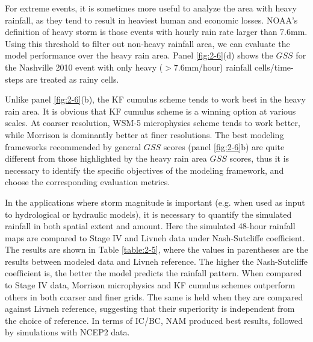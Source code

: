 For extreme events, it is sometimes more useful to analyze the area with heavy rainfall, as they tend to result in heaviest human and economic losses. NOAA’s definition of heavy storm is those events with hourly rain rate larger than 7.6mm. Using this threshold to filter out non-heavy rainfall area, we can evaluate the model performance over the heavy rain area. Panel \ref{fig:2-6}(d) shows the $GSS$ for the Nashville 2010 event with only heavy ($>$7.6mm/hour) rainfall cells/time-steps are treated as rainy cells.

Unlike panel \ref{fig:2-6}(b), the KF cumulus scheme tends to work best in the heavy rain area. It is obvious that KF cumulus scheme is a winning option at various scales. At coarser resolution, WSM-5 microphysics scheme tends to work better, while Morrison is dominantly better at finer resolutions. The best modeling frameworks recommended by general $GSS$ scores (panel \ref{fig:2-6}b) are quite different from those highlighted by the heavy rain area $GSS$ scores, thus it is necessary to identify the specific objectives of the modeling framework, and choose the corresponding evaluation metrics.

In the applications where storm magnitude is important (e.g. when used as input to hydrological or hydraulic models), it is necessary to quantify the simulated rainfall in both spatial extent and amount. Here the simulated 48-hour rainfall maps are compared to Stage IV and Livneh data under Nash-Sutcliffe coefficient. The results are shown in Table \ref{table:2-5}, where the values in parentheses are the results between modeled data and Livneh reference. The higher the Nash-Sutcliffe coefficient is, the better the model predicts the rainfall pattern. When compared to Stage IV data, Morrison microphysics and KF cumulus schemes outperform others in both coarser and finer grids. The same is held when they are compared against Livneh reference, suggesting that their superiority is independent from the choice of reference. In terms of IC/BC, NAM produced best results, followed by simulations with NCEP2 data.

